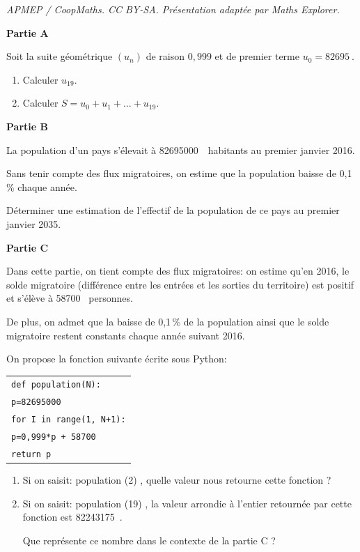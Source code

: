 \documentclass[10pt]{article}
\providecommand{\np}[2][]{{#2~#1}}
\begin{document}
\noindent\textit{APMEP / CoopMaths. CC BY-SA. Présentation adaptée par Maths Explorer.}\par\medskip
\medskip

\textbf{Partie A}

\medskip

Soit la suite géométrique $\left(u_n\right)$
de raison $0,999$ et de premier terme $u_0 = \np{82695}$. 


\medskip

\begin{enumerate}
\item Calculer $u_{19}$.
\item Calculer $S = u_0 + u_1 + \ldots + u_{19}$.
\end{enumerate}

\bigskip

\textbf{Partie B}

\medskip

La population d'un pays s'élevait à \np{82695000}~habitants au premier janvier 2016.

\medskip

Sans tenir compte des flux migratoires, on estime que la population baisse de 0,1\,\% chaque année.

Déterminer une estimation de l'effectif de la population de ce pays au premier janvier 2035.

\bigskip

\textbf{Partie C}

\medskip

Dans cette partie, on tient compte des flux migratoires: on estime qu'en 2016, le solde migratoire (différence entre les entrées et les sorties du territoire) est positif et s'élève à \np{58700} personnes.

De plus, on admet que la baisse de 0,1\,\% de la population ainsi que le solde migratoire restent constants chaque année suivant 2016.

On propose la fonction suivante écrite sous Python:

\begin{center}
\begin{tabular}{l}
\texttt{def population(N):}\\
\qquad \texttt{p=\np{82695000}}\\
\qquad \texttt{for I in range(1, N+1):}\\
\qquad \qquad  \texttt{p=0,999*p + \np{58700}}\\
\qquad \texttt{return p}\\
\end{tabular}
\end{center}

\smallskip

\begin{enumerate}
\item Si on saisit: \og population (2) \fg, quelle valeur nous retourne cette fonction ?
\item Si on saisit: \og population (19) \fg, la valeur arrondie à l'entier retournée par
cette fonction est \np{82243175}.

Que représente ce nombre dans le contexte de la partie C ?
\end{enumerate}

\bigskip
\end{document}
